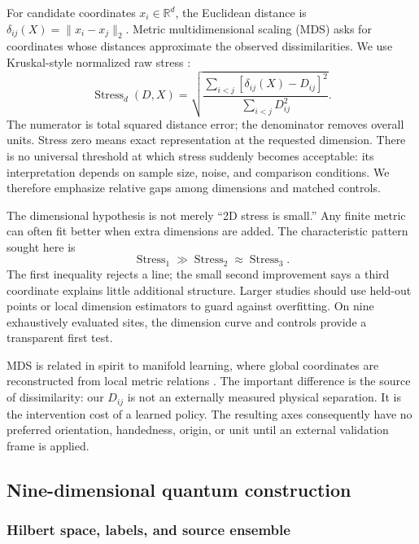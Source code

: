 \documentclass[11pt]{article}
\newcommand{\R}{\mathbb R}
\begin{document}
For candidate coordinates $x_i\in\R^d$, the Euclidean distance is
$\delta_{ij}(X)=\|x_i-x_j\|_2$. Metric multidimensional scaling (MDS) asks for
coordinates whose distances approximate the observed dissimilarities. We use
Kruskal-style normalized raw stress \cite{kruskal1964}:
\begin{equation}
 \operatorname{Stress}_d(D,X)
 =\sqrt{\frac{\sum_{i<j}[\delta_{ij}(X)-D_{ij}]^2}
 {\sum_{i<j}D_{ij}^2}}.
 \label{eq:stress}
\end{equation}
The numerator is total squared distance error; the denominator removes overall
units. Stress zero means exact representation at the requested dimension.
There is no universal threshold at which stress suddenly becomes acceptable:
its interpretation depends on sample size, noise, and comparison conditions.
We therefore emphasize relative gaps among dimensions and matched controls.

The dimensional hypothesis is not merely ``2D stress is small.'' Any finite
metric can often fit better when extra dimensions are added. The characteristic
pattern sought here is
\begin{equation}
 \operatorname{Stress}_1\gg\operatorname{Stress}_2
 \approx\operatorname{Stress}_3.
 \label{eq:dimension-gap}
\end{equation}
The first inequality rejects a line; the small second improvement says a third
coordinate explains little additional structure. Larger studies should use
held-out points or local dimension estimators to guard against overfitting. On
nine exhaustively evaluated sites, the dimension curve and controls provide a
transparent first test.

MDS is related in spirit to manifold learning, where global coordinates are
reconstructed from local metric relations \cite{tenenbaum2000}. The important
difference is the source of dissimilarity: our $D_{ij}$ is not an externally
measured physical separation. It is the intervention cost of a learned policy.
The resulting axes consequently have no preferred orientation, handedness,
origin, or unit until an external validation frame is applied.

\subsection{Nine-dimensional quantum construction}

\subsubsection{Hilbert space, labels, and source ensemble}
\end{document}
